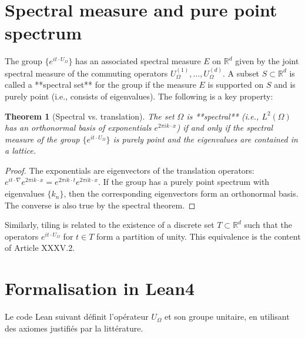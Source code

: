 \documentclass[11pt,a4paper]{article}
\newtheorem{theorem}{Theorem}[section]
\begin{document}
\section{Spectral measure and pure point spectrum}

The group $\{e^{i t \cdot U_\Omega}\}$ has an associated spectral measure $E$ on $\mathbb{R}^d$ given by the joint spectral measure of the commuting operators $U_\Omega^{(1)},\dots,U_\Omega^{(d)}$. A subset $S \subset \mathbb{R}^d$ is called a **spectral set** for the group if the measure $E$ is supported on $S$ and is purely point (i.e., consists of eigenvalues). The following is a key property:

\begin{theorem}[Spectral vs. translation]
The set $\Omega$ is **spectral** (i.e., $L^2(\Omega)$ has an orthonormal basis of exponentials $e^{2\pi i k \cdot x}$) if and only if the spectral measure of the group $\{e^{i t \cdot U_\Omega}\}$ is purely point and the eigenvalues are contained in a lattice.
\end{theorem}
\begin{proof}
The exponentials are eigenvectors of the translation operators: $e^{i t \cdot \nabla} e^{2\pi i k \cdot x} = e^{2\pi i k \cdot t} e^{2\pi i k \cdot x}$. If the group has a purely point spectrum with eigenvalues $\{k_n\}$, then the corresponding eigenvectors form an orthonormal basis. The converse is also true by the spectral theorem.
\end{proof}

Similarly, tiling is related to the existence of a discrete set $T \subset \mathbb{R}^d$ such that the operators $e^{i t \cdot U_\Omega}$ for $t \in T$ form a partition of unity. This equivalence is the content of Article XXXV.2.

\section{Formalisation in Lean4}

Le code Lean suivant définit l’opérateur $U_\Omega$ et son groupe unitaire, en utilisant des axiomes justifiés par la littérature.
\end{document}
